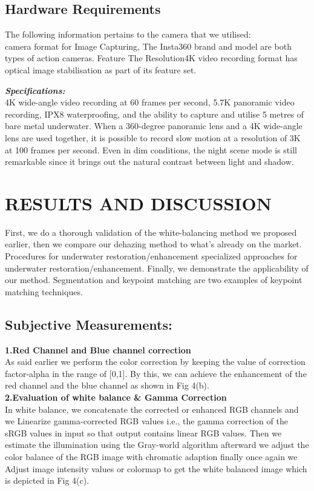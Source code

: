 \documentclass[conference]{IEEEtran}
\begin{document}
\subsection{Hardware Requirements}
The following information pertains to the camera that we utilised:\\
camera format for Image Capturing, The Insta360 brand and model are both types of action cameras. Feature The Resolution4K video recording format has optical image stabilisation as part of its feature set.\\
\par
\textbf{\textit{Specifications:}}\\
4K wide-angle video recording at 60 frames per second, 5.7K panoramic video recording, IPX8 waterproofing, and the ability to capture and utilise 5 metres of bare metal underwater. When a 360-degree panoramic lens and a 4K wide-angle lens are used together, it is possible to record slow motion at a resolution of 3K at 100 frames per second. Even in dim conditions, the night scene mode is still remarkable since it brings out the natural contrast between light and shadow.

\section{RESULTS AND DISCUSSION}
First, we do a thorough validation of the white-balancing method we proposed earlier, then we compare our dehazing method to what's already on the market. Procedures for underwater restoration/enhancement specialized approaches for underwater restoration/enhancement. Finally, we demonstrate the applicability of our method. Segmentation and keypoint matching are two examples of keypoint matching techniques.

\subsection{Subjective Measurements:}
\textbf{1.Red Channel and Blue channel correction}\\
As said earlier we perform the color correction by keeping the value of correction factor-alpha in the range of [0,1]. By this, we can achieve the enhancement of the red channel and the blue channel as shown in Fig 4(b).\\

\textbf{2.Evaluation of white balance & Gamma Correction}\\
In white balance, we concatenate the corrected or enhanced RGB channels and we Linearize gamma-corrected RGB values i.e., the gamma correction of the sRGB values in input so that output contains linear RGB values. Then we estimate the illumination using the Gray-world algorithm afterward we adjust the color balance of the RGB image with chromatic adaption finally once again we Adjust image intensity values or colormap to get the white balanced image which is depicted in Fig 4(c).\\
\end{document}

